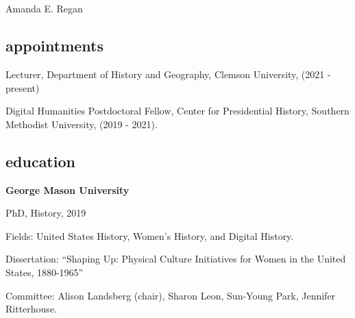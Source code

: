 \documentclass[11pt]{article}
\begin{document}
\thispagestyle{fancy}
\fancyfoot{}
\fancyhead{}
\renewcommand{\headrulewidth}{0pt}

\hfill\hfill\hfill
\hfill\hfill\hfill
\hfill\hfill\hfill
\hfill\hfill\hfill
\begin{minipage}[t]{1.6in}
   \\
   \\
\end{minipage}
\hfill
\begin{minipage}[t]{1.9in}
\end{minipage}


\vspace{0.1in}

{\Large Amanda E. Regan}\\[-0.1in]

\subsection{appointments}\label{current-position}


Lecturer, Department of History and Geography, Clemson University, (2021 - present)

Digital Humanities Postdoctoral Fellow, Center for Presidential History, Southern Methodist University, (2019 - 2021).

\subsection{education}\label{education}

\textbf{George Mason University}

\hfill\begin{minipage}{6.25in}

  PhD, History, 2019
  \vspace{0.10in}

  Fields: United States History, Women's History, and Digital History.

  \vspace{0.10in}

  Dissertation: ``Shaping Up: Physical Culture Initiatives for Women in the United States, 1880-1965''

  Committee: Alison Landsberg (chair), Sharon Leon, Sun-Young Park, Jennifer Ritterhouse.

\end{minipage}
\end{document}

